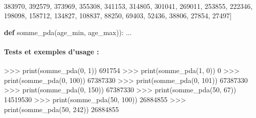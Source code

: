 \documentclass[a4paper,17pt]{extarticle}
\newenvironment{eleve}%
{\begin{activite}\color{noiramu}\\[-0.5cm]}
{\end{activite}}
\newenvironment{Shaded}{}{}
\newcommand{\KeywordTok}[1]{\textcolor[rgb]{0.00,0.44,0.13}{\textbf{{#1}}}}
\newcommand{\DecValTok}[1]{\textcolor[rgb]{0.25,0.63,0.44}{{#1}}}
\newcommand{\NormalTok}[1]{{#1}}
\newcommand{\OperatorTok}[1]{\textcolor[rgb]{0.40,0.40,0.40}{{#1}}}
\newcommand{\BuiltInTok}[1]{{#1}}
\begin{document}
\begin{eleve}
\begin{Shaded}
\begin{Highlighting}[]
       \DecValTok{383970}\NormalTok{, }\DecValTok{392579}\NormalTok{, }\DecValTok{373969}\NormalTok{, }\DecValTok{355308}\NormalTok{, }\DecValTok{341153}\NormalTok{, }\DecValTok{314805}\NormalTok{, }\DecValTok{301041}\NormalTok{, }\DecValTok{269011}\NormalTok{, }\DecValTok{253855}\NormalTok{, }\DecValTok{222346}\NormalTok{, }
       \DecValTok{198098}\NormalTok{, }\DecValTok{158712}\NormalTok{, }\DecValTok{134827}\NormalTok{, }\DecValTok{108837}\NormalTok{, }\DecValTok{88250}\NormalTok{, }\DecValTok{69403}\NormalTok{, }\DecValTok{52436}\NormalTok{, }\DecValTok{38806}\NormalTok{, }\DecValTok{27854}\NormalTok{, }\DecValTok{27497}\NormalTok{]}

\KeywordTok{def}\NormalTok{ somme\_pda(age\_min, age\_max)):}
\NormalTok{    ...}
\end{Highlighting}
\end{Shaded}

\hypertarget{tests-et-exemples-dusage}{%
\paragraph{Tests et exemples d'usage :}\label{tests-et-exemples-dusage}}

\begin{Shaded}
\begin{Highlighting}[]
\OperatorTok{\textgreater{}\textgreater{}\textgreater{}} \BuiltInTok{print}\NormalTok{(somme\_pda(}\DecValTok{0}\NormalTok{, }\DecValTok{1}\NormalTok{))}
\DecValTok{691754}
\OperatorTok{\textgreater{}\textgreater{}\textgreater{}} \BuiltInTok{print}\NormalTok{(somme\_pda(}\DecValTok{1}\NormalTok{, }\DecValTok{0}\NormalTok{))}
\DecValTok{0}
\OperatorTok{\textgreater{}\textgreater{}\textgreater{}} \BuiltInTok{print}\NormalTok{(somme\_pda(}\DecValTok{0}\NormalTok{, }\DecValTok{100}\NormalTok{))}
\DecValTok{67387330}
\OperatorTok{\textgreater{}\textgreater{}\textgreater{}} \BuiltInTok{print}\NormalTok{(somme\_pda(}\DecValTok{0}\NormalTok{, }\DecValTok{101}\NormalTok{))}
\DecValTok{67387330}
\OperatorTok{\textgreater{}\textgreater{}\textgreater{}} \BuiltInTok{print}\NormalTok{(somme\_pda(}\DecValTok{0}\NormalTok{, }\DecValTok{150}\NormalTok{))}
\DecValTok{67387330}
\OperatorTok{\textgreater{}\textgreater{}\textgreater{}} \BuiltInTok{print}\NormalTok{(somme\_pda(}\DecValTok{50}\NormalTok{, }\DecValTok{67}\NormalTok{))}
\DecValTok{14519530}
\OperatorTok{\textgreater{}\textgreater{}\textgreater{}} \BuiltInTok{print}\NormalTok{(somme\_pda(}\DecValTok{50}\NormalTok{, }\DecValTok{100}\NormalTok{))}
\DecValTok{26884855}
\OperatorTok{\textgreater{}\textgreater{}\textgreater{}} \BuiltInTok{print}\NormalTok{(somme\_pda(}\DecValTok{50}\NormalTok{, }\DecValTok{242}\NormalTok{))}
\DecValTok{26884855}
\end{Highlighting}
\end{Shaded}
        
        \end{eleve}
\end{document}

